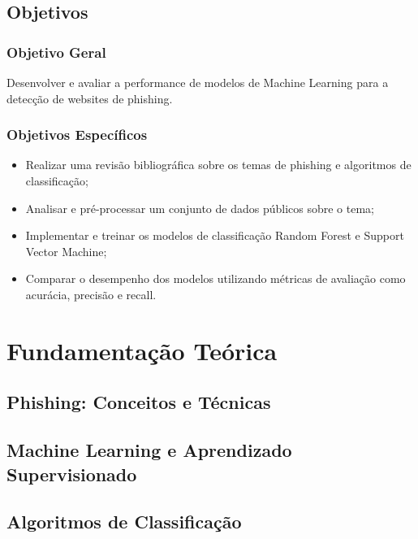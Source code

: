 \documentclass[12pt]{article}
\begin{document}
\subsection{Objetivos}
\subsubsection{Objetivo Geral}
Desenvolver e avaliar a performance de modelos de Machine Learning para a detecção de websites de phishing.

\subsubsection{Objetivos Específicos}
\begin{itemize}
    \item Realizar uma revisão bibliográfica sobre os temas de phishing e algoritmos de classificação;
    \item Analisar e pré-processar um conjunto de dados públicos sobre o tema;
    \item Implementar e treinar os modelos de classificação Random Forest e Support Vector Machine;
    \item Comparar o desempenho dos modelos utilizando métricas de avaliação como acurácia, precisão e recall.
\end{itemize}


\section{Fundamentação Teórica}
\label{sec:fundamentacao}
\subsection{Phishing: Conceitos e Técnicas}

\subsection{Machine Learning e Aprendizado Supervisionado}

\subsection{Algoritmos de Classificação}
\end{document}

